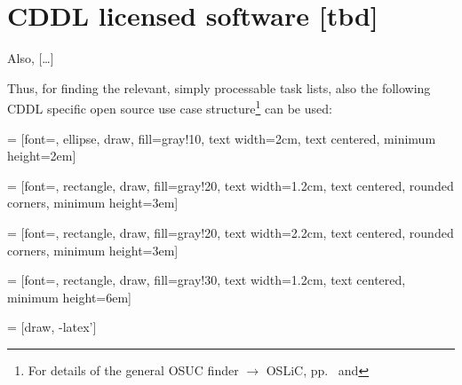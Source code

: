 %
%
%
%
%



\section{CDDL licensed software [tbd]}

Also, [\ldots]

Thus, for
finding the relevant, simply processable task lists, also the following CDDL
specific open source use case structure\footnote{For details of the general OSUC
finder $\rightarrow$ OSLiC, pp.\ \pageref{OsucTokens} and
\pageref{OsucDefinitionTree}} can be used:
 
 = [font=\small, ellipse, draw, fill=gray!10, 
    text width=2cm, text centered, minimum height=2em]

 = [font=\footnotesize, rectangle, draw, fill=gray!20, 
    text width=1.2cm, text centered, rounded corners, minimum height=3em]

 = [font=\footnotesize, rectangle, draw, fill=gray!20, 
    text width=2.2cm, text centered, rounded corners, minimum height=3em]
    
 = [font=\tiny, rectangle, draw, fill=gray!30, 
    text width=1.2cm, text centered, minimum height=6em]

 = [draw, -latex']

